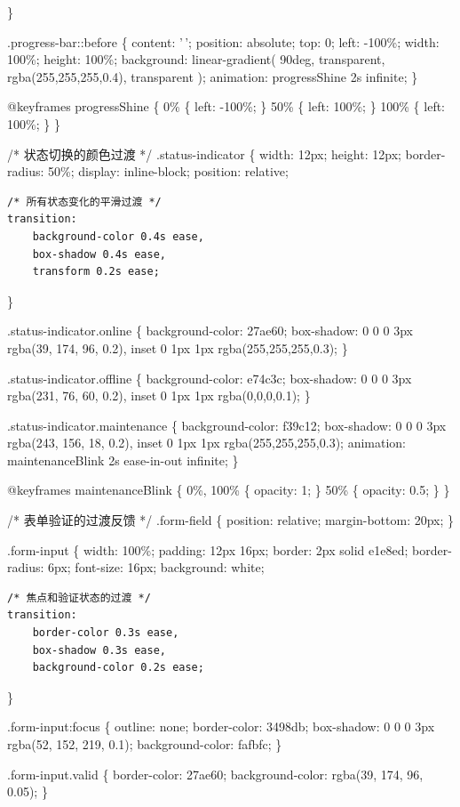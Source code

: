 \}

.progress-bar::before \{ content: '\,'; position: absolute; top: 0; left: -100\%; width: 100\%; height: 100\%; background: linear-gradient( 90deg, transparent, rgba(255,255,255,0.4), transparent ); animation: progressShine 2s infinite; \}

@keyframes progressShine \{ 0\% \{ left: -100\%; \} 50\% \{ left: 100\%; \} 100\% \{ left: 100\%; \} \}

/* 状态切换的颜色过渡 */ .status-indicator \{ width: 12px; height: 12px; border-radius: 50\%; display: inline-block; position: relative;

\begin{verbatim}
/* 所有状态变化的平滑过渡 */
transition: 
    background-color 0.4s ease,
    box-shadow 0.4s ease,
    transform 0.2s ease;
\end{verbatim}

\}

.status-indicator.online \{ background-color: 27ae60; box-shadow: 0 0 0 3px rgba(39, 174, 96, 0.2), inset 0 1px 1px rgba(255,255,255,0.3); \}

.status-indicator.offline \{ background-color: e74c3c; box-shadow: 0 0 0 3px rgba(231, 76, 60, 0.2), inset 0 1px 1px rgba(0,0,0,0.1); \}

.status-indicator.maintenance \{ background-color: f39c12; box-shadow: 0 0 0 3px rgba(243, 156, 18, 0.2), inset 0 1px 1px rgba(255,255,255,0.3); animation: maintenanceBlink 2s ease-in-out infinite; \}

@keyframes maintenanceBlink \{ 0\%, 100\% \{ opacity: 1; \} 50\% \{ opacity: 0.5; \} \}

/* 表单验证的过渡反馈 */ .form-field \{ position: relative; margin-bottom: 20px; \}

.form-input \{ width: 100\%; padding: 12px 16px; border: 2px solid e1e8ed; border-radius: 6px; font-size: 16px; background: white;

\begin{verbatim}
/* 焦点和验证状态的过渡 */
transition: 
    border-color 0.3s ease,
    box-shadow 0.3s ease,
    background-color 0.2s ease;
\end{verbatim}

\}

.form-input:focus \{ outline: none; border-color: 3498db; box-shadow: 0 0 0 3px rgba(52, 152, 219, 0.1); background-color: fafbfc; \}

.form-input.valid \{ border-color: 27ae60; background-color: rgba(39, 174, 96, 0.05); \}

